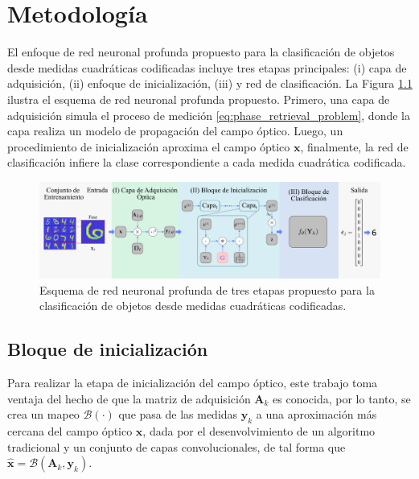 
\chapter{Metodología}

El enfoque de red neuronal profunda propuesto para la clasificación de objetos desde medidas cuadráticas codificadas incluye tres etapas principales: (i) capa de adquisición, (ii) enfoque de inicialización, (iii) y red de clasificación. La Figura \ref{fig:esquema_entrenamiento} ilustra el esquema de red neuronal profunda propuesto. Primero, una capa de adquisición simula el proceso de medición \eqref{eq:phase_retrieval_problem}, donde la capa realiza un modelo de propagación del campo óptico. Luego, un procedimiento de inicialización aproxima el campo óptico $\mathbf{x}$, finalmente, la red de clasificación infiere la clase correspondiente a cada medida cuadrática codificada.


\begin{figure}[!h]
    \centering
    \includegraphics[width=\linewidth]{images/esquema_entrenamiento.pdf}
    \caption{Esquema de red neuronal profunda de tres etapas propuesto para la clasificación de objetos desde medidas cuadráticas codificadas.}
    \label{fig:esquema_entrenamiento}
\end{figure}


\section{Bloque de inicialización}

Para realizar la etapa de inicialización del campo óptico, este trabajo toma ventaja del hecho de que la matriz de adquisición $\mathbf{A}_k$ es conocida, por lo tanto, se crea un mapeo $\mathcal{B}(\cdot)$ que pasa de las medidas $\mathbf{y}_k$ a una aproximación más cercana del campo óptico $\mathbf{x}$, dada por el desenvolvimiento de un algoritmo tradicional y un conjunto de capas convolucionales, de tal forma que $\hat{\mathbf{x}}=\mathcal{B}(\mathbf{A}_k, \mathbf{y}_k)$. 

